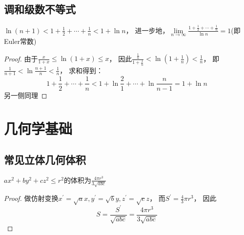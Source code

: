 \subsection{调和级数不等式}

\begin{theorem}[调和级数不等式]
  $\ln(n+1) < 1 + \frac{1}{2} + \cdots + \frac{1}{n} < 1 + \ln n$，
  进一步地，$\lim \limits _{n \rightarrow \infty} \frac{1 + \frac{1}{2} + \cdots + \frac{1}{n}}{\ln n} = 1$(即Euler常数)
\end{theorem}

\begin{proof}
  由于$\frac{x}{1+x} \leq \ln(1 + x) \leq x$，
  因此$\frac{\frac{1}{n}}{1 + \frac{1}{n}} < \ln(1 + \frac{1}{n}) < \frac{1}{n}$，
  即$\frac{1}{n+1} < \ln \frac{n+1}{n} < \frac{1}{n}$，
  求和得到：
  \begin{equation*}
    1 + \frac{1}{2} + \cdots + \frac{1}{n} < 1 + \ln \frac{2}{1} + \cdots + \ln \frac{n}{n-1} = 1 + \ln n
  \end{equation*}
  另一侧同理
\end{proof}



\section{几何学基础}




\subsection{常见立体几何体积}

\begin{theorem}[椭球面积]
  $ax^2 + by^2 + cz^2 \leq r^2$的体积为$\frac{4\pi r^3}{3 \sqrt{abc}}$
\end{theorem}

\begin{proof}
  做仿射变换$x^{\prime} = \sqrt{a}x, y^{\prime} = \sqrt{b}y, z^{\prime} = \sqrt{c}z$，
  而$S^{\prime} = \frac{4}{3}\pi r^3$，
  因此
  \begin{equation*}
    S = \frac{S^{\prime}}{\sqrt{abc}} = \frac{4\pi r^3}{3 \sqrt{abc}}
  \end{equation*}
\end{proof}

